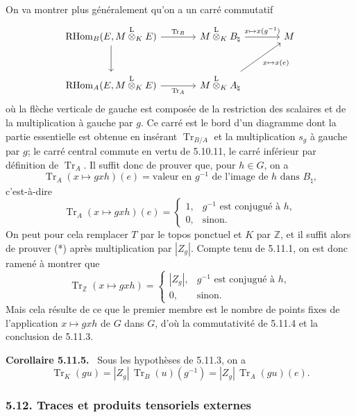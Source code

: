\documentclass[11pt]{article}
\newenvironment{statement}[1]{\par\medskip\noindent\textbf{#1.}\ }{\par\medskip}
\providecommand{\RHom}{\mathrm{RHom}}
\providecommand{\Tr}{\operatorname{Tr}}
\providecommand{\Tr}{\operatorname{Tr}}
\providecommand{\lten}{\overset{\mathrm L}{\otimes}}
\providecommand{\Tr}{\operatorname{Tr}}
\providecommand{\RHom}{\mathrm{RHom}}
\providecommand{\lten}{\overset{\mathrm L}{\otimes}}
\providecommand{\RHom}{\mathrm R\mathcal{H}om}
\providecommand{\lten}{\overset{\mathrm L}{\otimes}}
\providecommand{\Tr}{\operatorname{Tr}}
\providecommand{\lten}{\overset{\mathrm L}{\otimes}}
\providecommand{\lten}{\overset{\mathrm L}{\otimes}}
\providecommand{\lten}{\overset{\mathrm L}{\otimes}}
\begin{document}
On va montrer plus généralement qu'on a un carré commutatif
\[
\begin{tikzcd}[column sep=large,row sep=large]
\RHom_B(E,M\lten_KE) \arrow[r,"\Tr_B"] \arrow[d] & M\lten_KB_\natural \arrow[r,"x\mapsto x(g^{-1})"] & M\\
\RHom_A(E,M\lten_KE) \arrow[r,"\Tr_A"'] & M\lten_KA_\natural \arrow[ur,"x\mapsto x(e)"'] &
\end{tikzcd}
\]
où la flèche verticale de gauche est composée de la restriction des scalaires et de la multiplication à gauche par $g$. Ce carré est le bord d'un diagramme dont la partie essentielle est obtenue en insérant $\Tr_{B/A}$ et la multiplication $s_g$ à gauche par $g$; le carré central commute en vertu de 5.10.11, le carré inférieur par définition de $\Tr_A$. Il suffit donc de prouver que, pour $h\in G$, on a
\[
\Tr_A(x\mapsto gxh)(e)=\text{valeur en }g^{-1}\text{ de l'image de }h\text{ dans }B_\natural,
\]
c'est-à-dire
\begin{equation}\tag{*}
\Tr_A(x\mapsto gxh)(e)=
\begin{cases}
1,& g^{-1}\text{ est conjugué à }h,\\
0,& \text{sinon}.
\end{cases}
\end{equation}
On peut pour cela remplacer $T$ par le topos ponctuel et $K$ par $\mathbb Z$, et il suffit alors de prouver (*) après multiplication par $|Z_g|$. Compte tenu de 5.11.1, on est donc ramené à montrer que
\[
\Tr_{\mathbb Z}(x\mapsto gxh)=
\begin{cases}
|Z_g|,& g^{-1}\text{ est conjugué à }h,\\
0,& \text{sinon}.
\end{cases}
\]
Mais cela résulte de ce que le premier membre est le nombre de points fixes de l'application $x\mapsto gxh$ de $G$ dans $G$, d'où la commutativité de 5.11.4 et la conclusion de 5.11.3.

\begin{statement}{Corollaire 5.11.5}
Sous les hypothèses de 5.11.3, on a
\begin{equation}\tag{5.11.5}
\Tr_K(gu)=|Z_g|\,\Tr_B(u)(g^{-1})=|Z_g|\,\Tr_A(gu)(e).
\end{equation}
\end{statement}

\subsubsection*{5.12. Traces et produits tensoriels externes}
\end{document}
